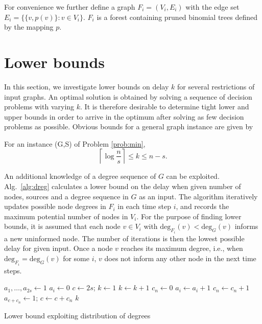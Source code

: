 For convenience we further define a graph $F_i=(V_i,E_i)$ with the edge set $E_i=\{\{v,p(v)\}:v\in V_i\}$.
$F_i$ is a forest containing pruned binomial trees defined by the mapping $p$.

%

\section{Lower bounds}
In this section, we investigate lower bounds on delay $k$ for several restrictions of input graphs.
An optimal solution is obtained by solving a sequence of decision problems with varying $k$. 
It is therefore desirable to determine tight lower and upper bounds in order to arrive in the optimum after solving as few decision problems as possible.
Obvious bounds for a general graph instance are given by
\begin{observation}
For an instance (G,S) of Problem \ref{prob:min},
$$\left\lceil\log\frac{n}{s}\right\rceil\leq k \leq n-s.$$
\end{observation}

An additional knowledge of a degree sequence of $G$ can be exploited. 
Alg.~\ref{alg:dreg} calculates a lower bound on the delay when given number of nodes, sources and a degree sequence in $G$ as an input.
The algorithm iteratively updates possible node degrees in $F_i$ in each time step $i$, and records the maximum potential number of nodes in $V_i$.
For the purpose of finding lower bounds, it is assumed that each node $v\in V_i$ with $\text{deg}_{F_i}(v)<\text{deg}_G(v)$ informs a new uninformed node.
The number of iterations is then the lowest possible delay for given input.
Once a node $v$ reaches its maximum degree, i.e., when $\text{deg}_{F_i}=\text{deg}_G(v)$ for some $i$, $v$ does not inform any other node in the next time steps.



\begin{algorithm}
$a_1,\dots,a_{2s}\leftarrow 1$\;%
 {
$a_i\leftarrow 0$\;
}
$c\leftarrow 2s$;
$k\leftarrow 1$\;
 {
$k\leftarrow k+1$\;
$c_n\leftarrow 0$\;
 {
	 {
		$a_i\leftarrow a_i + 1$\;
		$c_n\leftarrow c_n + 1$\;
		 {
			$a_{c+c_n}\leftarrow 1$; 
		}
	}
}
$c\leftarrow c + c_n$\;
}
\Return $k$\;
 \caption{Lower bound exploiting distribution of degrees}
\label{alg:dreg}
\end{algorithm}


